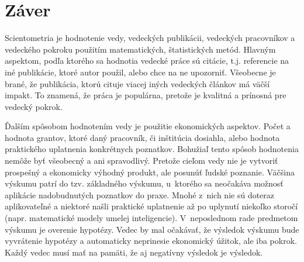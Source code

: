 \chapter*{Záver}

Scientometria je hodnotenie vedy, vedeckých publikácii, vedeckých pracovníkov a
vedeckého pokroku použitím matematických, štatistických metód.  Hlavným
aspektom, podľa ktorého sa hodnotia vedecké práce sú citácie, t.j. referencie na
iné publikácie, ktoré autor použil, alebo chce na ne upozorniť.  Všeobecne je
brané, že publikácia, ktorú cituje viacej iných vedeckých článkov má väčší
impakt.  To znamená, že práca je populárna, pretože je kvalitná a prínosná pre
vedecký pokrok.

Ďalším spôsobom hodnotením vedy je použitie ekonomických aspektov.  Počet a
hodnota grantov, ktoré daný pracovník, či inštitúcia dosiahla, alebo hodnota
praktického uplatnenia konkrétnych poznatkov.  Bohužiaľ tento spôsob hodnotenia
nemôže byť všeobecný a ani spravodlivý.  Pretože cieľom vedy nie je vytvoriť
prospešný a ekonomicky výhodný produkt, ale posunúť ľudské poznanie.  Väčšina
výskumu patrí do tzv. základného výskumu, u~ktorého sa neočakáva možnosť
aplikácie nadobudnutých poznatkov do praxe.  Mnohé z~nich nie sú doteraz
aplikovateľné a niektoré našli praktické uplatnenie až po uplynutí niekoľko
storočí (napr. matematické modely umelej inteligencie).  V~neposlednom rade
predmetom výskumu je overenie hypotézy.  Vedec by mal očakávať, že výsledok
výskumu bude vyvrátenie hypotézy a automaticky neprinesie ekonomický úžitok, ale
iba pokrok.  Každý vedec musí mať na pamäti, že aj negatívny výsledok je
výsledok.

